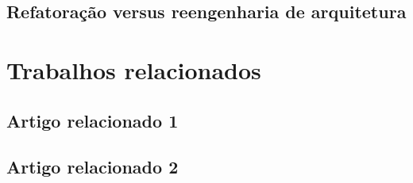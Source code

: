 \subsection{Refatoração versus reengenharia de arquitetura}

\section{Trabalhos relacionados}

\subsection{Artigo relacionado 1}

\subsection{Artigo relacionado 2}